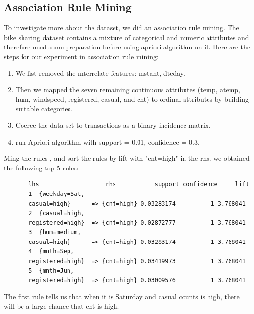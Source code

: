 \documentclass[12pt]{article}
\begin{document}
	\subsection{Association Rule Mining}	
	To investigate more about the dataset, we did an association rule mining. The bike sharing dataset contains a mixture of categorical and numeric attributes and therefore need some preparation before using apriori algorithm on it. Here are the steps for our experiment in association rule mining:
    \begin{enumerate}
    	\item We fist removed the interrelate features: instant, dteday.
    	\item Then we mapped the seven remaining continuous attributes (temp, atemp, hum, windspeed, registered, casual, and cnt) to ordinal attributes by building suitable categories.
    	\item Coerce the data set to transactions as a binary incidence matrix.
    	\item run Apriori algorithm with support = 0.01, confidence = 0.3.
    \end{enumerate}
	
	Ming the rules , and sort the rules by lift with "cnt=high" in the rhs. we obtained the following top 5 rules: \color{blue}
	\begin{verbatim}
	   lhs                   rhs           support confidence     lift
	   1  {weekday=Sat,                                                  
	   casual=high}      => {cnt=high} 0.03283174          1 3.768041
	   2  {casual=high,                                                  
	   registered=high}  => {cnt=high} 0.02872777          1 3.768041
	   3  {hum=medium,                                                   
	   casual=high}      => {cnt=high} 0.03283174          1 3.768041
	   4  {mnth=Sep,                                                     
	   registered=high}  => {cnt=high} 0.03419973          1 3.768041
	   5  {mnth=Jun,                                                     
	   registered=high}  => {cnt=high} 0.03009576          1 3.768041
	\end{verbatim} \color{black}
    The first rule tells us that when it is Saturday and casual counts is high, there will be a large chance that cnt is high.
    
\end{document}
